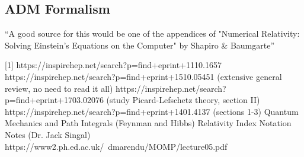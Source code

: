 \documentclass[12pt]{revtex4}
\begin{document}
\subsection{ADM Formalism} \label{ADM}
``A good source for this would be one of the appendices of "Numerical Relativity: Solving Einstein's Equations on the Computer" by Shapiro \& Baumgarte''

\begin{thebibliography}{}

[1] https://inspirehep.net/search?p=find+eprint+1110.1657 \newline
[2] https://inspirehep.net/search?p=find+eprint+1510.05451  (extensive general review, no need to read it all) \newline
[3] https://inspirehep.net/search?p=find+eprint+1703.02076   (study Picard-Lefschetz theory, section II) \newline
[4] https://inspirehep.net/search?p=find+eprint+1401.4137   (sections 1-3) \newline
[5] Quantum Mechanics and Path Integrals (Feynman and Hibbs) \newline
[6] Relativity Index Notation Notes (Dr. Jack Singal) \newline
[7] https://www2.ph.ed.ac.uk/~dmarendu/MOMP/lecture05.pdf \newline
[8] \newline
\end{thebibliography}
\end{document}
